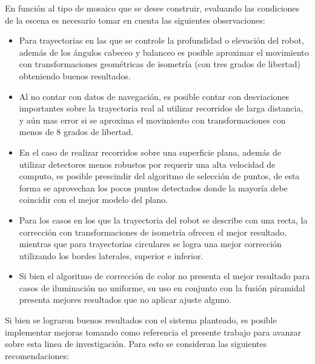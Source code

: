 En función al tipo de mosaico que se desee construir, evaluando las condiciones de la escena es necesario tomar en cuenta las siguientes observaciones:

\begin{itemize}
	\item Para trayectorias en las que se controle la profundidad o elevación del robot, además de los ángulos cabeceo y balanceo es posible aproximar el movimiento con transformaciones geométricas de isometría (con tres grados de libertad) obteniendo buenos resultados.
	
	\item Al no contar con datos de navegación, es posible contar con desviaciones importantes sobre la trayectoria real al utilizar recorridos de larga distancia, y aún mas error si se aproxima el movimiento con transformaciones con menos de 8 grados de libertad.
	
	\item En el caso de realizar recorridos sobre una superficie plana, además de utilizar detectores menos robustos por requerir una alta velocidad de computo, es posible prescindir del algoritmo de selección de puntos, de esta forma se aprovechan los pocos puntos detectados donde la mayoría debe coincidir con el mejor modelo del plano.
	
	\item Para los casos en los que la trayectoria del robot se describe con una recta, la corrección con transformaciones de isometría ofrecen el mejor resultado, mientras que para trayectorias circulares se logra una mejor corrección utilizando los bordes laterales, superior e inferior.
	
	\item Si bien el algoritmo de corrección de color no presenta el mejor resultado para casos de iluminación no uniforme, su uso en conjunto con la fusión piramidal presenta mejores resultados que no aplicar ajuste alguno.
\end{itemize}

Si bien se lograron buenos resultados con el sistema planteado, es posible implementar mejoras tomando como referencia el presente trabajo para avanzar sobre esta linea de investigación. Para esto se consideran las siguientes recomendaciones:

